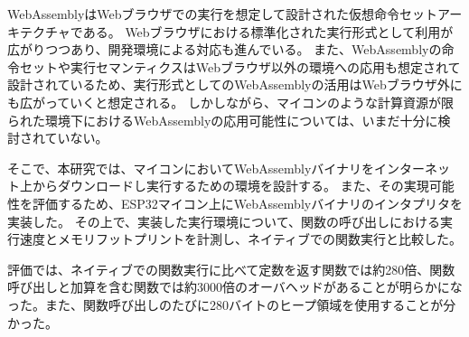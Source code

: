 \begin{jabstract}

WebAssemblyはWebブラウザでの実行を想定して設計された仮想命令セットアーキテクチャである。
Webブラウザにおける標準化された実行形式として利用が広がりつつあり、開発環境による対応も進んでいる。
また、WebAssemblyの命令セットや実行セマンティクスはWebブラウザ以外の環境への応用も想定されて設計されているため、実行形式としてのWebAssemblyの活用はWebブラウザ外にも広がっていくと想定される。
しかしながら、マイコンのような計算資源が限られた環境下におけるWebAssemblyの応用可能性については、いまだ十分に検討されていない。

そこで、本研究では、マイコンにおいてWebAssemblyバイナリをインターネット上からダウンロードし実行するための環境を設計する。
また、その実現可能性を評価するため、ESP32マイコン上にWebAssemblyバイナリのインタプリタを実装した。
その上で、実装した実行環境について、関数の呼び出しにおける実行速度とメモリフットプリントを計測し、ネイティブでの関数実行と比較した。

評価では、ネイティブでの関数実行に比べて定数を返す関数では約280倍、関数呼び出しと加算を含む関数では約3000倍のオーバヘッドがあることが明らかになった。また、関数呼び出しのたびに280バイトのヒープ領域を使用することが分かった。

\end{jabstract}
